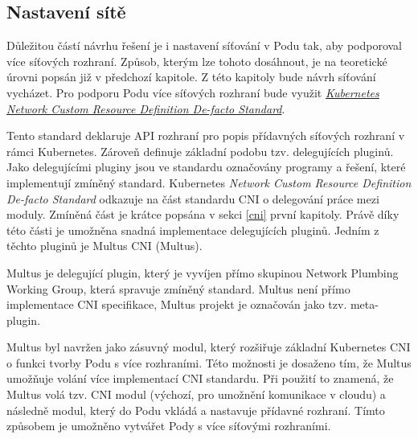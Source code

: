 \subsection{Nastavení sítě}\label{sec:multus}
Důležitou částí návrhu řešení je i nastavení síťování v Podu tak, aby podporoval více síťových rozhraní. Způsob, kterým lze tohoto dosáhnout, je na teoretické úrovni popsán již v předchozí kapitole. Z této kapitoly bude návrh síťování vycházet. Pro podporu Podu více síťových rozhraní bude využit \href{https://github.com/k8snetworkplumbingwg/multi-net-spec}{\textit{Kubernetes Network Custom Resource Definition De-facto Standard}}.   

Tento standard deklaruje API rozhraní pro popis přídavných síťových rozhraní v rámci Kubernetes. Zároveň definuje základní podobu tzv. delegujících pluginů. Jako delegujícími pluginy jsou ve standardu označovány programy a řešení, které implementují zmíněný standard. Kubernetes \textit{Network Custom Resource Definition De-facto Standard} odkazuje na část standardu CNI o delegování práce mezi moduly. Zmíněná část je krátce popsána v sekci \ref{cni}  první kapitoly. Právě díky této části je umožněna snadná implementace delegujících pluginů. Jedním z těchto pluginů je Multus CNI (Multus). 



Multus je delegující plugin, který je vyvíjen přímo skupinou Network Plumbing Working Group, která spravuje zmíněný standard. Multus není přímo implementace CNI specifikace, Multus projekt je označován jako tzv. meta-plugin. \cite{hayashi_2019_multuscni}

Multus byl navržen jako zásuvný modul, který rozšiřuje základní Kubernetes CNI o funkci tvorby Podu s více rozhraními. Této možnosti je dosaženo tím, že Multus umožňuje volání více implementací CNI standardu. Při použití to znamená, že Multus volá tzv.  CNI modul (výchozí, pro umožnění komunikace v cloudu) a následně  modul, který do Podu vkládá a nastavuje přídavné rozhraní. Tímto způsobem je umožněno vytvářet Pody s více síťovými rozhraními. \cite{hayashi_2019_multuscni}

